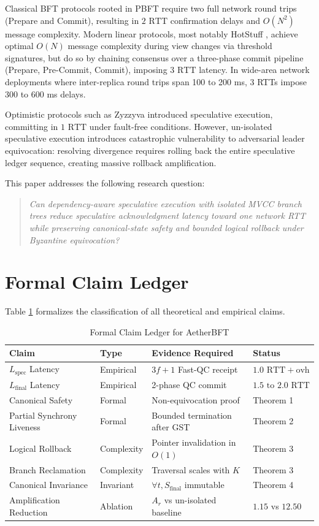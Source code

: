 \documentclass[journal,compsoc]{IEEEtran}
\begin{document}
Classical BFT protocols rooted in PBFT \cite{castro1999practical} require two full network round trips (Prepare and Commit), resulting in $2\text{ RTT}$ confirmation delays and $O(N^2)$ message complexity. Modern linear protocols, most notably HotStuff \cite{yin2019hotstuff}, achieve optimal $O(N)$ message complexity during view changes via threshold signatures, but do so by chaining consensus over a three-phase commit pipeline (Prepare, Pre-Commit, Commit), imposing $3\text{ RTT}$ latency. In wide-area network deployments where inter-replica round trips span 100 to 200 ms, 3 RTTs impose 300 to 600 ms delays.

Optimistic protocols such as Zyzzyva \cite{kotla2007zyzzyva} introduced speculative execution, committing in $1\text{ RTT}$ under fault-free conditions. However, un-isolated speculative execution introduces catastrophic vulnerability to adversarial leader equivocation: resolving divergence requires rolling back the entire speculative ledger sequence, creating massive rollback amplification.

This paper addresses the following research question:
\begin{quote}
\textit{Can dependency-aware speculative execution with isolated MVCC branch trees reduce speculative acknowledgment latency toward one network RTT while preserving canonical-state safety and bounded logical rollback under Byzantine equivocation?}
\end{quote}

\section{Formal Claim Ledger}
Table \ref{tab:claim_ledger} formalizes the classification of all theoretical and empirical claims.

\begin{table}[htbp]
\caption{Formal Claim Ledger for AetherBFT}
\label{tab:claim_ledger}
\centering
\begin{tabular}{@{}llll@{}}
\toprule
\textbf{Claim} & \textbf{Type} & \textbf{Evidence Required} & \textbf{Status} \\
\midrule
$L_{\text{spec}}$ Latency & Empirical & $3f+1$ Fast-QC receipt & $1.0\text{ RTT} + \text{ovh}$ \\
$L_{\text{final}}$ Latency & Empirical & 2-phase QC commit & $1.5\text{ to } 2.0\text{ RTT}$ \\
Canonical Safety & Formal & Non-equivocation proof & Theorem 1 \\
Partial Synchrony Liveness & Formal & Bounded termination after GST & Theorem 2 \\
Logical Rollback & Complexity & Pointer invalidation in $O(1)$ & Theorem 3 \\
Branch Reclamation & Complexity & Traversal scales with $K$ & Theorem 3 \\
Canonical Invariance & Invariant & $\forall t, S_{\text{final}}$ immutable & Theorem 4 \\
Amplification Reduction & Ablation & $A_r$ vs un-isolated baseline & $1.15$ vs $12.50$ \\
\bottomrule
\end{tabular}
\end{table}
\end{document}
